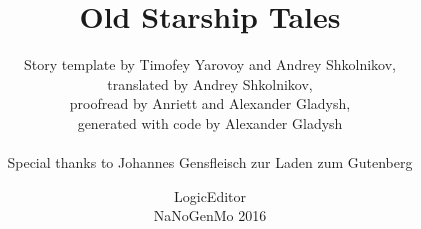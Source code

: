 \documentclass[ebook,oneside,final,openright]{memoir}
\begin{document}
\frontmatter
{}
\title{\Huge{Old Starship Tales}}
\author{
  Story template by Timofey Yarovoy and Andrey Shkolnikov,\\
  translated by Andrey Shkolnikov,\\
  proofread by Anriett and Alexander Gladysh,\\
  generated with code by Alexander Gladysh\\
  \\
  Special thanks to Johannes Gensfleisch zur Laden zum Gutenberg
}
\date{LogicEditor\\NaNoGenMo 2016}

\maketitle

\mainmatter
\end{document}

